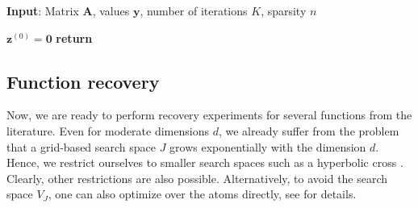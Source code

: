 \documentclass[11pt,reqno, a4paper]{article}
\numberwithin{equation}{section}
\newcommand{\cosamp}{\texttt{CoSaMP}}
\begin{document}
\begin{algorithm}[H]
\caption{\cosamp}\label{alg:CoSaMP}
\textbf{Input}: Matrix \(\mathbf{A}\), values $\mathbf{y}$, number of iterations $K$, sparsity \(n\)
\begin{algorithmic}[1]
\State $ \mathbf{z}^{(0)} = \mathbf 0$
\State {}
\State {}
\State {}
\State {}
\EndFor
\EndFunction
\State \textbf{return} 
\end{algorithmic}
\end{algorithm}

\subsection{Function recovery}
Now, we are ready to perform recovery experiments for several functions from the literature.
Even for moderate dimensions $d$, we already suffer from the problem that a grid-based search space $J$ grows exponentially with the dimension $d$.
Hence, we restrict ourselves to smaller search spaces such as a hyperbolic cross \cite{DTU18}.
Clearly, other restrictions are also possible.
Alternatively, to avoid the search space $V_J$, one can also optimize over the atoms directly, see \cite{HerNeu2025} for details.
\end{document}
